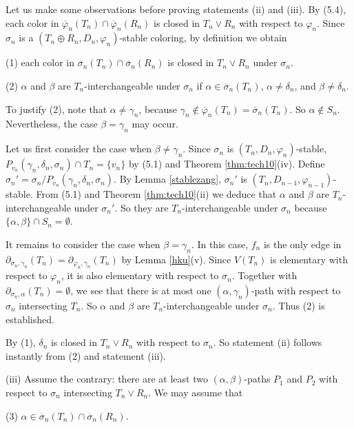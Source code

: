 \documentclass[11pt]{article}
\newcommand{\phibar}{\overline{\varphi}}
\begin{document}
Let us make some observations before proving statements (ii) and (iii). By (5.4), each color in 
$\overline{\varphi}_n(T_n) \cap \overline{\varphi}_n(R_n)$ is closed in $T_n\vee R_n$ with respect to $\varphi_n$.
Since $\sigma_n$ is a $(T_n \oplus R_n, D_n,\varphi_n)$-stable coloring, by definition we obtain

(1) each color in $\overline{\sigma}_n(T_n) \cap \overline{\sigma}_n(R_n)$ is closed in $T_n\vee R_n$ under $\sigma_n$.

(2) $\alpha$ and $\beta$ are $T_n$-interchangeable under $\sigma_n$ if $\alpha\in \overline{\sigma}_n(T_n)$, 
$\alpha \ne \delta_n$, and $\beta \ne \delta_n$. 

To justify (2), note that $\alpha\neq \gamma_n$, because $\gamma_n\notin\phibar_n(T_n)=\overline{\sigma}_n(T_n)$. So
$\alpha \notin S_n$. Nevertheless, the case $\beta=\gamma_n$ may occur.

Let us first consider the case when $\beta \ne \gamma_n$. Since $\sigma_n$ is $(T_n, D_{n},\varphi_{n})$-stable, $P_{v_n}(\gamma_n,\delta_n,\sigma_n)\cap T_n
=\{v_n\}$ by (5.1) and Theorem \ref{thm:tech10}(iv). Define $\sigma_n'=\sigma_n/P_{v_n}(\gamma_n,\delta_n,\sigma_n)$. By Lemma \ref{stablezang},
$\sigma_n'$ is $(T_n,D_{n-1}, \varphi_{n-1})$-stable.  From (5.1) and Theorem \ref{thm:tech10}(ii) 
we deduce that $\alpha$ and $\beta$ are $T_n$-interchangeable under $\sigma_n'$. So they are $T_n$-interchangeable 
under $\sigma_n$ because $\{\alpha,\beta\}\cap S_n=\emptyset$.

It remains to consider the case when $\beta=\gamma_n$. In this case, $f_n$ is the only edge in
$\partial_{\sigma_n, \gamma_n}(T_n)=\partial_{\varphi_n, \gamma_n}(T_n)$ by Lemma \ref{hku}(v). Since $V(T_n)$ is elementary
with respect to $\varphi_n$, it is also elementary with respect to $\sigma_n$. Together with $\partial_{\sigma_n, \alpha}(T_n)
=\emptyset$, we see that there is at most one $(\alpha,\gamma_n)$-path with respect to $\sigma_n$ intersecting $T_n$. So 
$\alpha$ and $\beta$ are $T_n$-interchangeable under $\sigma_n$. Thus (2) is established.

By (1), $\delta_n$ is closed in $T_n\vee R_n$ with respect to $\sigma_n$. So statement (ii) follows instantly from
(2) and statement (iii).

(iii) Assume the contrary: there are at least two $(\alpha,\beta)$-paths $P_1$ and $P_2$ with respect to 
$\sigma_n$ intersecting $T_n \vee R_n$. We may assume that

(3)  $\alpha\in \overline{\sigma}_n(T_n) \cap \overline{\sigma}_n(R_n)$. 
\end{document}
